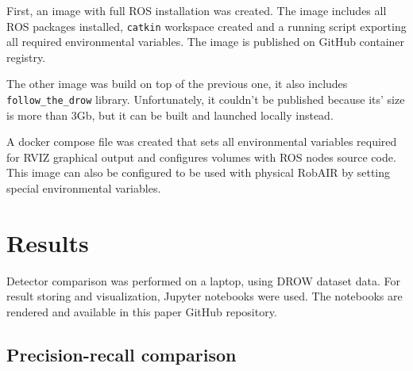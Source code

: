 \documentclass{article}
\begin{document}
First, an image with full ROS installation was created.
The image includes all ROS packages installed, \texttt{catkin}\cite{catkin_wiki} workspace created and a running script exporting all required environmental variables.
The image is published on GitHub container registry\cite{FTD_docker_image}.

The other image was build on top of the previous one, it also includes \texttt{follow\_the\_drow} library.
Unfortunately, it couldn't be published because its' size is more than 3Gb, but it can be built and launched locally instead.

A docker compose file was created that sets all environmental variables required for RVIZ graphical output and configures volumes with ROS nodes source code.
This image can also be configured to be used with physical RobAIR by setting special environmental variables.

\section{Results}

Detector comparison was performed on a laptop, using DROW dataset data.
For result storing and visualization, Jupyter notebooks were used.
The notebooks are rendered and available in this paper GitHub repository\cite{FTD_comparison}.

\subsection{Precision-recall comparison}
\end{document}
